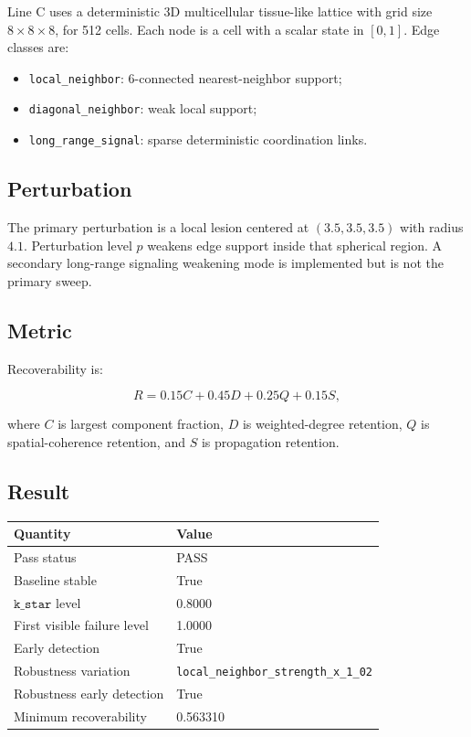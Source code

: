 \documentclass[11pt]{article}
\begin{document}
Line C uses a deterministic 3D multicellular tissue-like lattice with grid size \(8\times 8\times 8\), for 512 cells. Each node is a cell with a scalar state in \([0,1]\). Edge classes are:

\begin{itemize}
\item \texttt{local\_neighbor}: 6-connected nearest-neighbor support;
\item \texttt{diagonal\_neighbor}: weak local support;
\item \texttt{long\_range\_signal}: sparse deterministic coordination links.
\end{itemize}

\subsection{Perturbation}

The primary perturbation is a local lesion centered at \((3.5,3.5,3.5)\) with radius \(4.1\). Perturbation level \(p\) weakens edge support inside that spherical region. A secondary long-range signaling weakening mode is implemented but is not the primary sweep.

\subsection{Metric}

Recoverability is:

\[
R=0.15C+0.45D+0.25Q+0.15S,
\]

where \(C\) is largest component fraction, \(D\) is weighted-degree retention, \(Q\) is spatial-coherence retention, and \(S\) is propagation retention.

\subsection{Result}

\begin{center}
\begin{tabular}{ll}
\toprule
Quantity & Value \\
\midrule
Pass status & PASS \\
Baseline stable & True \\
\(\texttt{k\_star}\) level & 0.8000 \\
First visible failure level & 1.0000 \\
Early detection & True \\
Robustness variation & \texttt{local\_neighbor\_strength\_x\_1\_02} \\
Robustness early detection & True \\
Minimum recoverability & 0.563310 \\
\bottomrule
\end{tabular}
\end{center}
\end{document}

